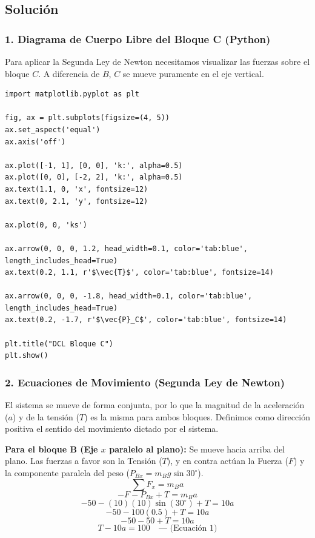 \documentclass[12pt, a4paper]{article}
\begin{document}
\subsection*{Solución}

\subsubsection*{1. Diagrama de Cuerpo Libre del Bloque C (Python)}
Para aplicar la Segunda Ley de Newton necesitamos visualizar las fuerzas sobre el bloque $C$. A diferencia de $B$, $C$ se mueve puramente en el eje vertical.

\begin{lstlisting}
import matplotlib.pyplot as plt

fig, ax = plt.subplots(figsize=(4, 5))
ax.set_aspect('equal')
ax.axis('off')

ax.plot([-1, 1], [0, 0], 'k:', alpha=0.5)
ax.plot([0, 0], [-2, 2], 'k:', alpha=0.5)
ax.text(1.1, 0, 'x', fontsize=12)
ax.text(0, 2.1, 'y', fontsize=12)

ax.plot(0, 0, 'ks')

ax.arrow(0, 0, 0, 1.2, head_width=0.1, color='tab:blue', length_includes_head=True)
ax.text(0.2, 1.1, r'$\vec{T}$', color='tab:blue', fontsize=14)

ax.arrow(0, 0, 0, -1.8, head_width=0.1, color='tab:blue', length_includes_head=True)
ax.text(0.2, -1.7, r'$\vec{P}_C$', color='tab:blue', fontsize=14)

plt.title("DCL Bloque C")
plt.show()
\end{lstlisting}

\subsubsection*{2. Ecuaciones de Movimiento (Segunda Ley de Newton)}
El sistema se mueve de forma conjunta, por lo que la magnitud de la aceleración ($a$) y de la tensión ($T$) es la misma para ambos bloques. Definimos como dirección positiva el sentido del movimiento dictado por el sistema.

\textbf{Para el bloque B (Eje $x$ paralelo al plano):}
Se mueve hacia arriba del plano. Las fuerzas a favor son la Tensión ($T$), y en contra actúan la Fuerza ($F$) y la componente paralela del peso ($P_{Bx} = m_B g \sin 30^\circ$).
$$ \sum F_x = m_B a $$
$$ -F - P_{Bx} + T = m_B a $$
$$ -50 - (10)(10) \sin(30^\circ) + T = 10a $$
$$ -50 - 100(0.5) + T = 10a $$
$$ -50 - 50 + T = 10a $$
$$ T - 10a = 100 \quad \text{--- (Ecuación 1)} $$
\end{document}
